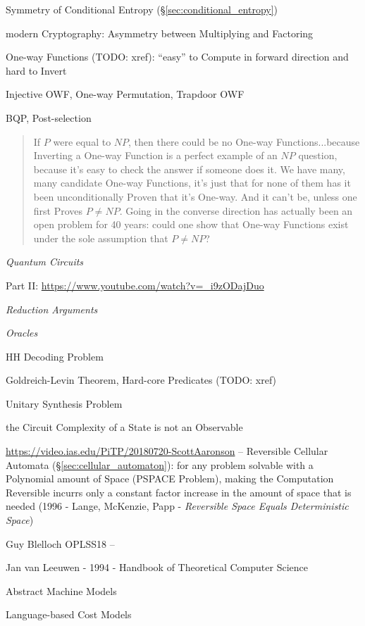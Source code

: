 Symmetry of Conditional Entropy (\S\ref{sec:conditional_entropy})

modern Cryptography: Asymmetry between Multiplying and Factoring

One-way Functions (TODO: xref): ``easy'' to Compute in forward direction and
hard to Invert

Injective OWF, One-way Permutation, Trapdoor OWF

BQP, Post-selection

\begin{quote}
  If $P$ were equal to $NP$, then there could be no One-way Functions...because
  Inverting a One-way Function is a perfect example of an $NP$ question, because
  it's easy to check the answer if someone does it. We have many, many candidate
  One-way Functions, it's just that for none of them has it been unconditionally
  Proven that it's One-way. And it can't be, unless one first Proves $P \neq
  NP$. Going in the converse direction has actually been an open problem for 40
  years: could one show that One-way Functions exist under the sole assumption
  that $P \neq NP$?
\end{quote}

\emph{Quantum Circuits}

Part II: \url{https://www.youtube.com/watch?v=_i9zODajDuo}

\emph{Reduction Arguments}

\emph{Oracles}

HH Decoding Problem

Goldreich-Levin Theorem, Hard-core Predicates (TODO: xref)

Unitary Synthesis Problem

the Circuit Complexity of a State is not an Observable

\url{https://video.ias.edu/PiTP/20180720-ScottAaronson} -- Reversible Cellular
Automata (\S\ref{sec:cellular_automaton}): for any problem solvable with a
Polynomial amount of Space (PSPACE Problem), making the Computation Reversible
incurrs only a constant factor increase in the amount of space that is needed
(1996 - Lange, McKenzie, Papp - \emph{Reversible Space Equals Deterministic
  Space})


\asterism


Guy Blelloch OPLSS18 --

Jan van Leeuwen - 1994 - Handbook of Theoretical Computer Science

Abstract Machine Models

Language-based Cost Models

